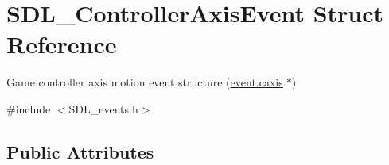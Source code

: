 \hypertarget{structSDL__ControllerAxisEvent}{}\section{S\+D\+L\+\_\+\+Controller\+Axis\+Event Struct Reference}
\label{structSDL__ControllerAxisEvent}


Game controller axis motion event structure (\hyperlink{unionSDL__Event_aa8f6df0f2716fae56204b12ab4a4c289}{event.\+caxis}.$\ast$)  




{\ttfamily \#include $<$S\+D\+L\+\_\+events.\+h$>$}

\subsection*{Public Attributes}
